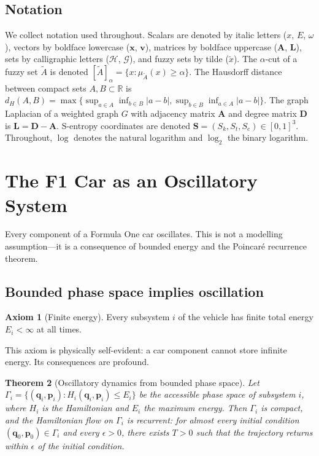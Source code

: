 \documentclass[twocolumn,10pt,a4paper]{article}
\newtheorem{theorem}{Theorem}[section]
\theoremstyle{definition}
\newtheorem{axiom}[theorem]{Axiom}
\theoremstyle{remark}
\newcommand{\R}{\mathbb{R}}
\newcommand{\Hcal}{\mathcal{H}}
\newcommand{\Gcal}{\mathcal{G}}
\newcommand{\vect}[1]{\boldsymbol{#1}}
\newcommand{\mat}[1]{\mathbf{#1}}
\newcommand{\fuzzy}[1]{\widetilde{#1}}
\newcommand{\acut}[1]{[#1]_\alpha}
\newcommand{\Sent}{\mathbf{S}}
\begin{document}
\subsection{Notation}

We collect notation used throughout. Scalars are denoted by italic letters ($x$, $E$, $\omega$), vectors by boldface lowercase ($\vect{x}$, $\vect{v}$), matrices by boldface uppercase ($\mat{A}$, $\mat{L}$), sets by calligraphic letters ($\Hcal$, $\Gcal$), and fuzzy sets by tilde ($\fuzzy{x}$). The $\alpha$-cut of a fuzzy set $\fuzzy{A}$ is denoted $\acut{\fuzzy{A}} = \{x : \mu_{\fuzzy{A}}(x) \geq \alpha\}$. The Hausdorff distance between compact sets $A, B \subset \R$ is $d_H(A, B) = \max\{\sup_{a \in A} \inf_{b \in B} |a-b|, \sup_{b \in B} \inf_{a \in A} |a-b|\}$. The graph Laplacian of a weighted graph $G$ with adjacency matrix $\mat{A}$ and degree matrix $\mat{D}$ is $\mat{L} = \mat{D} - \mat{A}$. S-entropy coordinates are denoted $\Sent = (S_k, S_t, S_e) \in [0,1]^3$. Throughout, $\log$ denotes the natural logarithm and $\log_2$ the binary logarithm.


\section{The F1 Car as an Oscillatory System}\label{sec:oscillatory}

Every component of a Formula One car oscillates. This is not a modelling assumption---it is a consequence of bounded energy and the Poincar\'{e} recurrence theorem.

\subsection{Bounded phase space implies oscillation}

\begin{axiom}[Finite energy]\label{ax:finite_energy}
Every subsystem $i$ of the vehicle has finite total energy $E_i < \infty$ at all times.
\end{axiom}

This axiom is physically self-evident: a car component cannot store infinite energy. Its consequences are profound.

\begin{theorem}[Oscillatory dynamics from bounded phase space]\label{thm:oscillation}
Let $\Gamma_i = \{(\vect{q}_i, \vect{p}_i) : H_i(\vect{q}_i, \vect{p}_i) \leq E_i\}$ be the accessible phase space of subsystem $i$, where $H_i$ is the Hamiltonian and $E_i$ the maximum energy. Then $\Gamma_i$ is compact, and the Hamiltonian flow on $\Gamma_i$ is recurrent: for almost every initial condition $(\vect{q}_0, \vect{p}_0) \in \Gamma_i$ and every $\epsilon > 0$, there exists $T > 0$ such that the trajectory returns within $\epsilon$ of the initial condition.
\end{theorem}
\end{document}
